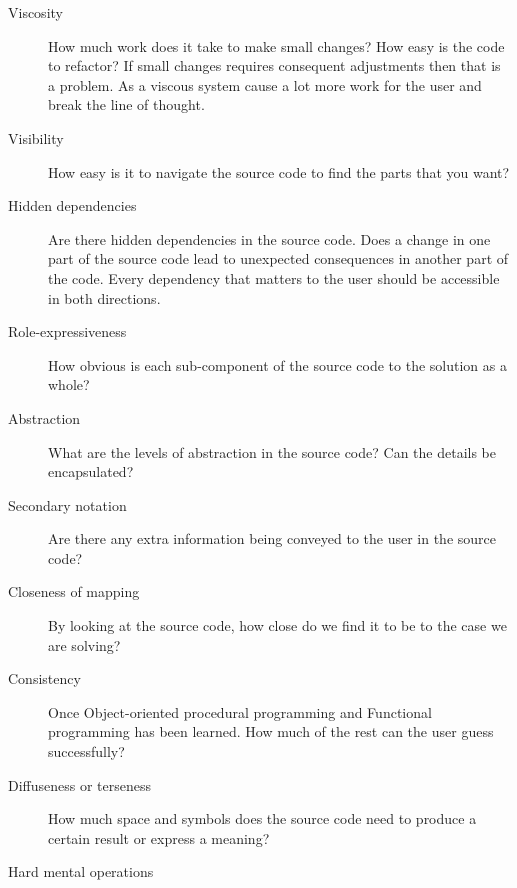 \begin{description}

\item[ Viscosity ]

How much work does it take to make small changes? How easy is the code to
refactor? If small changes requires consequent adjustments then that is a
problem. As a viscous system cause a lot more work for the user and break the
line of thought.

\item[ Visibility ]

How easy is it to navigate the source code to find the parts that you want?

\item[ Hidden dependencies ]

Are there hidden dependencies in the source code. Does a change in one part of
the source code lead to unexpected consequences in another part of the code.
Every dependency that matters to the user should be accessible in both
directions. 

\item[ Role-expressiveness ]

How obvious is each sub-component of the source code to the solution as a whole?

\item[ Abstraction ]

What are the levels of abstraction in the source code? Can the details be
encapsulated?

\item[ Secondary notation ]

Are there any extra information being conveyed to the user in the source code?

\item[ Closeness of mapping ]

By looking at the source code, how close do we find it to be to the case
we are solving?

\item[ Consistency ]

Once Object-oriented procedural programming and Functional programming has been
learned. How much of the rest can the user guess successfully? 

\item[ Diffuseness or terseness ]

How much space and symbols does the source code need to produce a certain result
or express a meaning?

\item[ Hard mental operations ]


\end{description}
